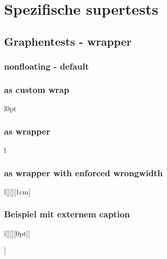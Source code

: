 \documentclass[Typ=CUSTOMLAYOUT,Vorlesung=LAII]{Lilly}
\begin{document}
\chapter{Spezifische supertests}

\section{Graphentests - wrapper }
\subsection{nonfloating - default}
    \begin{graph}
        \plotline{\x*\x}
    \end{graph}\lipsum[6-8]

\subsection{as custom wrap}
\begin{wrapfigure}{l}{0pt}
    \begin{graph}
        \plotline{\x*\x}
    \end{graph}
\end{wrapfigure}\lipsum[6-8]

\subsection{as wrapper}

        \begin{wgraph}{l}
            \plotline[purple]{\x*\x}
        \end{wgraph}\lipsum[6-8]

\subsection{as wrapper with enforced wrongwidth}
        \begin{wgraph}{l}[][][1cm]
            \plotline[Ao]{\x*\x}
        \end{wgraph}\lipsum[6-8]

\subsection{Beispiel mit externem caption}
        \begin{wgraph}{l}[][][0pt][\caption{Wichtiger Graph}]
            \plotline[Azure]{\x*\x}
        \end{wgraph}\lipsum[6-8]
\end{document}
